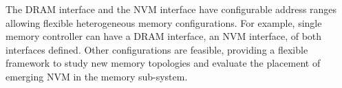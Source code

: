 The DRAM interface and the NVM interface have configurable address ranges allowing flexible heterogeneous memory configurations.
For example, single memory controller can have a DRAM interface, an NVM interface, of both interfaces defined.
Other configurations are feasible, providing a flexible framework to study new memory topologies and evaluate the placement of emerging NVM in the memory sub-system.

